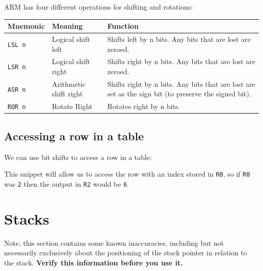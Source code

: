 ARM has four different operations for shifting and rotations:

\begin{center}
	\begin{tabularx}{\textwidth}{|l|X|X|}
		\hline
		{\bf Mnemonic} & {\bf Meaning} & {\bf Function}\\ \hline

		{\tt LSL n} & Logical shift left & Shifts left by n bits. Any bits that
		are lost are zeroed.\\ \hline

		{\tt LSR n} & Logical shift right &  Shifts right by n bits. Any bits
		that are lost are zeroed.\\ \hline

		{\tt ASR n} & Arithmetic shift right & Shifts right by n bits. Any bits
		that are lost are set as the sign bit (to preserve the signed bit).\\
		\hline

		{\tt ROR n} & Rotate Right & Rotates right by n bits.\\ \hline
	\end{tabularx}
\end{center}

\subsection{Accessing a row in a table}

We can use bit shifts to access a row in a table:


This snippet will allow us to access the row with an index stored in {\tt R0},
so if {\tt R0} was {\tt 2} then the output in {\tt R2} would be {\tt 6}.

\section{Stacks}

{\footnotesize Note, this section contains some known inaccuracies, including but not
necessarily exclusively about the positioning of the stack pointer in relation
to the stack. {\bf Verify this information before you use it.}}


